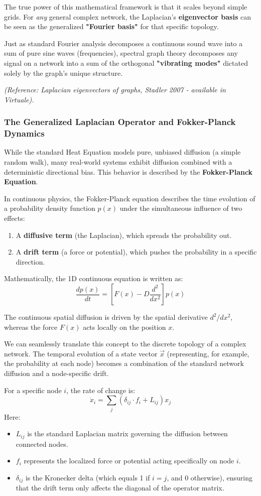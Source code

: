 The true power of this mathematical framework is that it scales beyond simple grids. For \textit{any} general complex network, the Laplacian's \textbf{eigenvector basis} can be seen as the generalized \textbf{"Fourier basis"} for that specific topology.

Just as standard Fourier analysis decomposes a continuous sound wave into a sum of pure sine waves (frequencies), spectral graph theory decomposes any signal on a network into a sum of the orthogonal \textbf{"vibrating modes"} dictated solely by the graph's unique structure.

\textit{(Reference: Laplacian eigenvectors of graphs, Stadler 2007 - available in Virtuale).}

\subsubsection{The Generalized Laplacian Operator and Fokker-Planck Dynamics}
While the standard Heat Equation models pure, unbiased diffusion (a simple random walk), many real-world systems exhibit diffusion combined with a deterministic directional bias. This behavior is described by the \textbf{Fokker-Planck Equation}.

In continuous physics, the Fokker-Planck equation describes the time evolution of a probability density function \( p(x) \) under the simultaneous influence of two effects:
\begin{enumerate}
    \item A \textbf{diffusive term} (the Laplacian), which spreads the probability out.
    \item A \textbf{drift term} (a force or potential), which pushes the probability in a specific direction.
\end{enumerate}
Mathematically, the 1D continuous equation is written as:
\[
    \frac{dp(x)}{dt} = \left[ F(x) - D\frac{d^2}{dx^2} \right] p(x)
\]
\begin{remark}
    The continuous spatial diffusion is driven by the spatial derivative \( d^2/dx^2 \), whereas the force \( F(x) \) acts locally on the position \( x \).
\end{remark}

We can seamlessly translate this concept to the discrete topology of a complex network. The temporal evolution of a state vector \( \vec{x} \) (representing, for example, the probability at each node) becomes a combination of the standard network diffusion and a node-specific drift.

For a specific node \( i \), the rate of change is:
\[
    \dot{x}_i = \sum_j \left( \delta_{ij} \cdot f_i + L_{ij} \right) x_j
\]
Here:
\begin{itemize}
    \item \( L_{ij} \) is the standard Laplacian matrix governing the diffusion between connected nodes.
    \item \( f_i \) represents the localized force or potential acting specifically on node \( i \).
    \item \( \delta_{ij} \) is the Kronecker delta (which equals 1 if \( i = j \), and 0 otherwise), ensuring that the drift term only affects the diagonal of the operator matrix.
\end{itemize}

